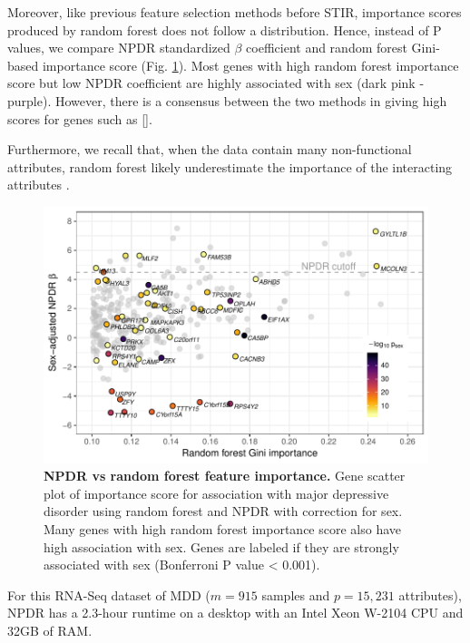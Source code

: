 \documentclass[10pt]{article}
\begin{document}
Moreover, like previous feature selection methods before STIR, importance scores produced by random forest does not follow a distribution.
Hence, instead of P values, we compare NPDR standardized $\beta$ coefficient and random forest Gini-based importance score (Fig. \ref{fig:npdr_rf_mdd}).
Most genes with high random forest importance score but low NPDR coefficient are highly associated with sex (dark pink - purple).
However, there is a consensus between the two methods in giving high scores for genes such as [].

Furthermore, we recall that, when the data contain many non-functional attributes, random forest likely underestimate the importance of the interacting attributes \cite{mckinney2009capturing,winham2012snp}.


\begin{figure}[!tpb]%
\centerline{\includegraphics[]{../figs/mostafavi_npdr_rf_mdd.pdf}}
\caption{{\bf NPDR vs random forest feature importance.}
Gene scatter plot of importance score for association with major depressive disorder using random forest and NPDR with correction for sex. Many genes with high random forest importance score also have high association with sex. Genes are labeled if they are strongly associated with sex (Bonferroni P value < 0.001).}
\label{fig:npdr_rf_mdd}
\end{figure}

For this RNA-Seq dataset of MDD ($m=915$ samples and $p=15,231$ attributes), NPDR has a 2.3-hour runtime on a desktop with an Intel Xeon W-2104 CPU and 32GB of RAM. 
\end{document}
